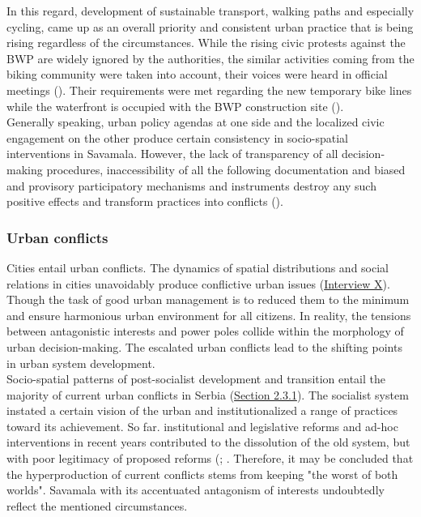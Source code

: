 \documentclass[11pt]{report}
\begin{document}
In this regard, development of sustainable transport, walking paths and especially cycling, came up as an overall priority and consistent urban practice that is being rising regardless of the circumstances.
While the rising civic protests against the BWP are widely ignored by the authorities, the similar activities coming from the biking community were taken into account, their voices were heard in official meetings (\cite{media}).
Their requirements were met regarding the new temporary bike lines while the waterfront is occupied with the BWP construction site (\cite{media}).
\\

Generally speaking, urban policy agendas at one side and the localized civic engagement on the other produce certain consistency in socio-spatial interventions in Savamala.
However, the lack of transparency of all decision-making procedures, inaccessibility of all the following documentation and biased and provisory participatory mechanisms and instruments destroy any such positive effects and transform practices into conflicts (\cite{MinistarstvoProstora2014}).

\subsubsection{Urban conflicts}

Cities entail urban conflicts. The dynamics of spatial distributions and social relations in cities unavoidably produce conflictive urban issues (\href{InterviewX}{Interview X}).
Though the task of good urban management is to reduced them to the minimum and ensure harmonious urban environment for all citizens.
In reality, the tensions between antagonistic interests and power poles collide within the morphology of urban decision-making. The escalated urban conflicts lead to the shifting points in urban system development.
\\

Socio-spatial patterns of post-socialist development and transition entail the majority of current urban conflicts in Serbia (\href{Section 2.3.1}{Section 2.3.1}).
The socialist system instated a certain vision of the urban and institutionalized a range of practices toward its achievement.
So far. institutional and legislative reforms and ad-hoc interventions in recent years contributed to the dissolution of the old system, but with poor legitimacy of proposed reforms (\href{ref}{\citealt{world_bank_cities_2000}}; \href{ref}{\citealt{vujosevic_postsocijalisticka_2010}}.
Therefore, it may be concluded that the hyperproduction of current conflicts stems from keeping "the worst of both worlds".
Savamala with its accentuated antagonism of interests undoubtedly reflect the mentioned circumstances.
\\
\end{document}

